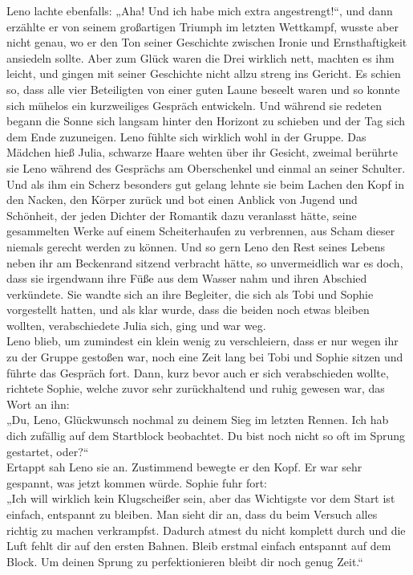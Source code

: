 \documentclass[ngerman,smalldemyvopaper,11pt,oneside,onecolumn,openright,extrafontsizes]{memoir}
\begin{document}
Leno lachte ebenfalls: „Aha! Und ich habe mich extra angestrengt!“, und dann erzählte er von seinem großartigen Triumph im letzten Wettkampf, wusste aber nicht genau, wo er den Ton seiner Geschichte zwischen Ironie und Ernsthaftigkeit ansiedeln sollte. Aber zum Glück waren die Drei wirklich nett, machten es ihm leicht, und gingen mit seiner Geschichte nicht allzu streng ins Gericht. Es schien so, dass alle vier Beteiligten von einer guten Laune beseelt waren und so konnte sich mühelos ein kurzweiliges Gespräch entwickeln. Und während sie redeten begann die Sonne sich langsam hinter den Horizont zu schieben und der Tag sich dem Ende zuzuneigen. Leno fühlte sich wirklich wohl in der Gruppe. Das Mädchen hieß Julia, schwarze Haare wehten über ihr Gesicht, zweimal berührte sie Leno während des Gesprächs am Oberschenkel und einmal an seiner Schulter. Und als ihm ein Scherz besonders gut gelang lehnte sie beim Lachen den Kopf in den Nacken, den Körper zurück und bot einen Anblick von Jugend und Schönheit, der jeden Dichter der Romantik dazu veranlasst hätte, seine gesammelten Werke auf einem Scheiterhaufen zu verbrennen, aus Scham dieser niemals gerecht werden zu können. Und so gern Leno den Rest seines Lebens neben ihr am Beckenrand sitzend verbracht hätte, so unvermeidlich war es doch, dass sie irgendwann ihre Füße aus dem Wasser nahm und ihren Abschied verkündete. Sie wandte sich an ihre Begleiter, die sich als Tobi und Sophie vorgestellt hatten, und als klar wurde, dass die beiden noch etwas bleiben wollten, verabschiedete Julia sich, ging und war weg.
\vspace{0.5em} \\
Leno blieb, um zumindest ein klein wenig zu verschleiern, dass er nur wegen ihr zu der Gruppe gestoßen war, noch eine Zeit lang bei Tobi und Sophie sitzen und führte das Gespräch fort. Dann, kurz bevor auch er sich verabschieden wollte, richtete Sophie, welche zuvor sehr zurückhaltend und ruhig gewesen war, das Wort an ihn:\\
„Du, Leno, Glückwunsch nochmal zu deinem Sieg im letzten Rennen. Ich hab dich zufällig auf dem Startblock beobachtet. Du bist noch nicht so oft im Sprung gestartet, oder?“\\
Ertappt sah Leno sie an. Zustimmend bewegte er den Kopf. Er war sehr gespannt, was jetzt kommen würde. Sophie fuhr fort:\\
„Ich will wirklich kein Klugscheißer sein, aber das Wichtigste vor dem Start ist einfach, entspannt zu bleiben. Man sieht dir an, dass du beim Versuch alles richtig zu machen verkrampfst. Dadurch atmest du nicht komplett durch und die Luft fehlt dir auf den ersten Bahnen. Bleib erstmal einfach entspannt auf dem Block. Um deinen Sprung zu perfektionieren bleibt dir noch genug Zeit.“
\end{document}
